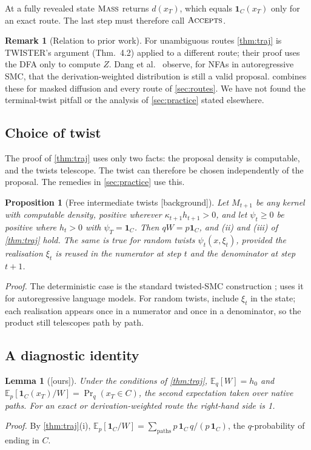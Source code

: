 \documentclass[11pt]{article}
\newtheorem{proposition}[theorem]{Proposition}
\newtheorem{lemma}[theorem]{Lemma}
\theoremstyle{definition}
\newtheorem{remark}[theorem]{Remark}
\newcommand{\one}{\mathbf{1}}
\newcommand{\E}{\mathbb{E}}
\newcommand{\op}[1]{\textup{\textsc{#1}}}
\newcommand{\status}[1]{\textsf{\small[#1]}}
\newcommand{\proofref}[1]{\par\noindent\textit{Proof.} #1\par\smallskip}
\begin{document}
At a fully revealed state $\op{Mass}$ returns $d(x_T)$, which equals $\one_C(x_T)$ only for an exact route. The
last step must therefore call $\op{Accepts}$.

\begin{remark}[Relation to prior work]
For unambiguous routes \cref{thm:traj} is TWISTER's argument \cite{twister} (Thm.~4.2) applied to a different
route; their proof uses the DFA only to compute $Z$. Dang et al.\ \cite{dang2026icml} observe, for NFAs in
autoregressive SMC, that the derivation-weighted distribution is still a valid proposal.  combines
these for masked diffusion and every route of \cref{sec:routes}. We have not found the terminal-twist pitfall or
the analysis of \cref{sec:practice} stated elsewhere.
\end{remark}

\subsection{Choice of twist}
The proof of \cref{thm:traj} uses only two facts: the proposal density is computable, and the twists telescope.
The twist can therefore be chosen independently of the proposal. The remedies in \cref{sec:practice} use this.

\begin{proposition}[Free intermediate twists \status{background}]\label{prop:free}
Let $M_{t+1}$ be any kernel with computable density, positive wherever $\kappa_{t+1}h_{t+1}>0$, and let
$\psi_t\ge0$ be positive where $h_t>0$ with $\psi_T=\one_C$. Then $qW=p\one_C$, and (ii) and (iii) of
\cref{thm:traj} hold. The same is true for \emph{random} twists $\psi_t(x,\xi_t)$, provided the realisation
$\xi_t$ is reused in the numerator at step $t$ and the denominator at step $t+1$.
\end{proposition}
\proofref{The deterministic case is the standard twisted-SMC construction \cite{delmoral2004}; \cite{zhao2024}
uses it for autoregressive language models. For random twists, include $\xi_t$ in the state; each realisation
appears once in a numerator and once in a denominator, so the product still telescopes path by path.}

\subsection{A diagnostic identity}
\begin{lemma}[\status{ours}]\label{lem:twosided}
Under the conditions of \cref{thm:traj},
$\E_q[W]=h_0$ and $\E_p[\one_C(x_T)/W]=\Pr_q(x_T\in C)$, the second expectation taken over native paths. For an
exact or derivation-weighted route the right-hand side is 1.
\end{lemma}
\proofref{By \cref{thm:traj}(i), $\E_p[\one_C/W]=\sum_{\text{paths}}p\,\one_C\,q/(p\,\one_C)$, the
$q$-probability of ending in $C$.}
\end{document}
